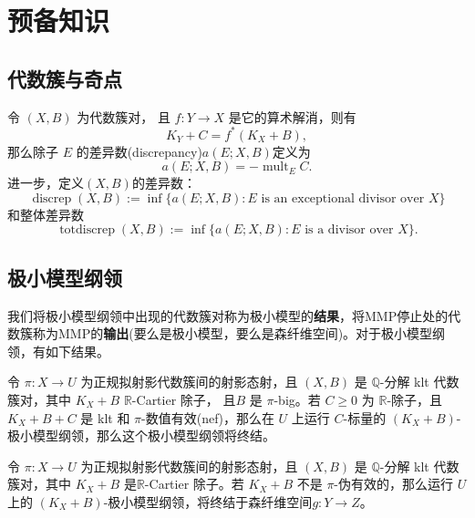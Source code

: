 \chapter{预备知识}
\section{代数簇与奇点}
\begin{definition}

	令 $(X, B)$ 为代数簇对， 且 $f: Y\to X$ 是它的算术解消，则有
	\[
		K_{Y}+C=f^*(K_{X}+B)
		,\]
	那么除子 $E$ 的差异数(discrepancy)$a(E;X,B) $定义为
	\[
		a(E;X,B)=-\operatorname{mult}_{E}C
		.\]
	进一步，定义$(X,B) $的差异数：
	\[
		\operatorname{discrep}(X, B) := \inf\{a(E; X, B) : E \text{ is an exceptional divisor over } X \}
	\]
	和整体差异数
	\[
		\operatorname{totdiscrep}(X, B) :=\operatorname{inf}\{a(E; X, B) : E \text{ is a divisor over } X\}.
	\]
\end{definition}

\section{极小模型纲领}
我们将极小模型纲领中出现的代数簇对称为极小模型的\textbf{结果}，将MMP停止处的代数簇称为MMP的\textbf{输出}(要么是极小模型，要么是森纤维空间)。对于极小模型纲领，有如下结果。
\begin{theorem}[标量MMP的终结定理]
	\cite[Corollary 1.4.2]{BCHM10} 令 $ \pi: X\to U $ 为正规拟射影代数簇间的射影态射，且 $(X, B)$ 是  $\mathbb{Q}$-分解 klt 代数簇对，其中 $K_{X}+B$  $\mathbb{R}$-Cartier 除子， 且$B$ 是 $\pi$-big。若 $C\geqslant0$ 为 $\mathbb{R}$-除子，且$K_{X}+B+C$ 是 klt 和  $\pi$-数值有效(nef)，那么在 $U$ 上运行 $C$-标量的  $(K_{X}+B)$-极小模型纲领，那么这个极小模型纲领将终结。
\end{theorem}
\begin{theorem}[极小模型输出]\label{notpseudoeffmfs}
	\cite[Corollary 1.3.3]{BCHM10} 令 $ \pi: X\to U $ 为正规拟射影代数簇间的射影态射，且 $(X, B)$ 是 $\mathbb{Q}$-分解 klt 代数簇对，其中 $K_{X}+B$ 是$\mathbb{R}$-Cartier 除子。若 $K_{X}+B$ 不是 $\pi$-伪有效的，那么运行 $U$ 上的  $(K_{X}+B)$-极小模型纲领，将终结于森纤维空间$g:Y\to Z$。
\end{theorem}

